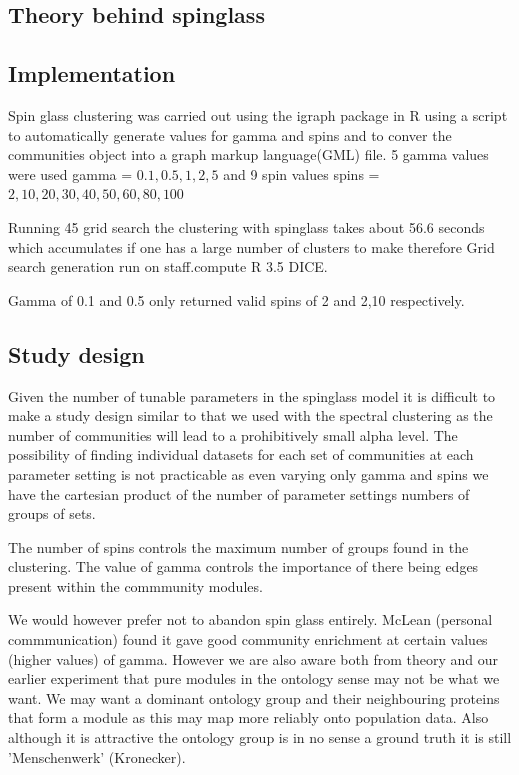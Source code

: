 

\subsection{Theory behind spinglass}

\subsection{Implementation}
Spin glass clustering was carried out using the igraph package in R using a script to automatically generate values for gamma and spins and to conver the communities object into a graph markup language(GML) file. 5 gamma values were used gamma = $0.1,0.5,1,2,5$ and 9 spin values spins = $2,10,20,30,40,50,60,80,100$ 

Running 45 grid search the clustering with spinglass takes about 56.6 seconds which accumulates if one has a large number of clusters to make therefore Grid search generation run on staff.compute R 3.5 DICE.

Gamma of 0.1 and 0.5 only returned valid spins of 2 and 2,10 respectively. 
\subsection{Study design}
Given the number of tunable parameters in the spinglass model it is difficult to make a study design similar to that we used with the spectral clustering as the number of communities will lead to a prohibitively small alpha level. The possibility of finding individual datasets for each set of communities at each parameter setting is not practicable as even varying only gamma and spins we have the cartesian product of the number of parameter settings numbers of groups of sets.

The number of spins controls the maximum number of groups found in the clustering. The value of gamma controls the importance of there being edges present within the commmunity modules.

We would however prefer not to abandon spin glass entirely. McLean (personal commmunication) found it gave good community enrichment at certain values (higher values) of gamma. However we are also aware both from theory and our earlier experiment that pure modules in the ontology sense may not be what we want. We may want a dominant ontology group and their neighbouring proteins that form a module as this may map more reliably onto population data. Also although it is attractive the ontology group is in no sense a ground truth it is still 'Menschenwerk' (Kronecker).

